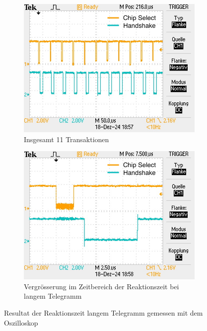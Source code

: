 \begin{figure}[H]
    \centering
    \begin{subfigure}[b]{0.45\textwidth}
        \centering
        \includegraphics[width=\linewidth]{Figures/Chap4/ESP32/Gesammte Transaktion Lang.JPG} 
        \caption{Insgesamt 11 Transaktionen}
        \label{fig:GesTransLang}
    \end{subfigure}
    \hfill 
    \begin{subfigure}[b]{0.45\textwidth}
        \centering
        \includegraphics[width=\linewidth]{Figures/Chap4/ESP32/Reaktionszeit Lang.JPG} 
        \caption{Vergrösserung im Zeitbereich der Reaktionszeit bei langem Telegramm}
        \label{fig:ReakLang}
    \end{subfigure}
    \caption{Resultat der Reaktionszeit langem Telegramm gemessen mit dem Oszilloskop}
    \label{fig:ResultatOsziReaktionLang} 
\end{figure}

